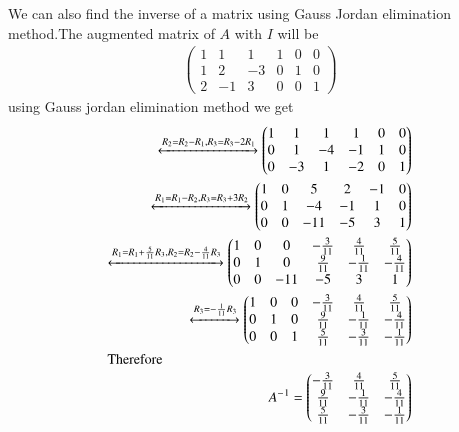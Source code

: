 \documentclass[journal,12pt,twocolumn]{IEEEtran}
\newcommand{\myvec}[1]{\ensuremath{\begin{pmatrix}#1\end{pmatrix}}}
\numberwithin{equation}{subsection}
\begin{document}
We can also find the inverse of a matrix using Gauss Jordan elimination method.The augmented matrix of $A$ with $I$ will be
\begin{align}
    \myvec{1 & 1 & 1 & 1 & 0 & 0\\
       1 & 2 & -3 & 0 & 1 &0\\
       2 & -1 & 3 & 0 & 0 &1}
\end{align}
using Gauss jordan elimination method we get
\begin{align}
    \xleftrightarrow{R_2=R_2-R_1,R_3=R_3-2R_1}\myvec{1 & 1 & 1 & 1 & 0 & 0\\
       0 & 1 & -4 & -1 & 1 &0\\
       0 & -3 & 1 & -2 & 0 &1}\\
    \xleftrightarrow{R_1=R_1-R_2,R_3=R_3+3R_2}\myvec{1 & 0 & 5 & 2 & -1 & 0\\
       0 & 1 & -4 & -1 & 1 &0\\
       0 & 0 & -11 & -5 & 3 &1}\\
    \xleftrightarrow{R_1=R_1+\frac{5}{11}R_3,R_2=R_2-\frac{4}{11}R_3}\myvec{1 & 0 & 0 & -\frac{3}{11} & \frac{4}{11} & \frac{5}{11}\\
       0 & 1 & 0 & \frac{9}{11} & -\frac{1}{11} & -\frac{4}{11}\\
       0 & 0 & -11 & -5 & 3 &1}\\
     \xleftrightarrow{R_3=-\frac{1}{11}R_3}\myvec{1 & 0 & 0 & -\frac{3}{11} & \frac{4}{11} & \frac{5}{11}\\
       0 & 1 & 0 & \frac{9}{11} & -\frac{1}{11} & -\frac{4}{11}\\
       0 & 0 & 1 & \frac{5}{11} & -\frac{3}{11} & -\frac{1}{11}}\\
      \intertext{Therefore}
       A^-{^1}=\myvec{-\frac{3}{11} & \frac{4}{11} & \frac{5}{11}\\
       \frac{9}{11} & -\frac{1}{11} & -\frac{4}{11}\\
       \frac{5}{11} & -\frac{3}{11} & -\frac{1}{11}}
\end{align}
\end{document}
